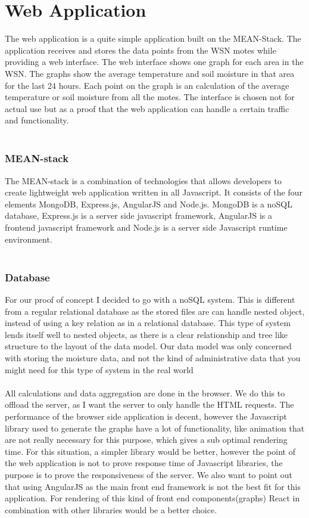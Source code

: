 \documentclass[]{uiophd}
\begin{document}
\section{Web Application}
The web application is a quite simple application built on the MEAN-Stack. The application receives and stores the data points from the WSN motes while providing a web interface. The web interface shows one graph for each area in the WSN. The graphs show the average temperature and soil moisture in that area for the last 24 hours. Each point on the graph is an calculation of the average temperature or soil moisture from all the motes. The interface is chosen not for actual use but as a proof that the web application can handle a certain traffic and functionality. 
\\\\
\subsubsection{MEAN-stack}
The MEAN-stack is a combination of technologies that allows developers to create lightweight web application written in all Javascript. It consists of the four elements MongoDB, Express.js, AngularJS and Node.js. MongoDB is a noSQL database, Express.js is a server side javascript framework, AngularJS is a frontend javascript framework and Node.js is a server side Javascript runtime environment. 
\\\\
\subsubsection{Database}
For our proof of concept I decided to go with a noSQL system. This is different from a regular relational database as the stored files are can handle nested object, instead of using a key relation as in a relational database. This type of system lends itself well to nested objects, as there is a clear relationship and tree like structure to the layout of the data model. Our data model was only concerned with storing the moisture data, and not the kind of administrative data that you might need for this type of system in the real world
\\\\
All calculations and data aggregation are done in the browser. We do this to offload the server, as I want the server to only handle the HTML requests. The performance of the browser side application is decent, however the Javascript library used to generate the graphs have a lot of functionality, like animation that are not really necessary for this purpose, which gives a sub optimal rendering time. For this situation, a simpler library would be better, however the point of the web application is not to prove response time of Javascript libraries, the purpose is to prove the responsiveness of the server. We also want to point out that using AngularJS as the main front end framework is not the best fit for this application. For rendering of this kind of front end components(graphs) React in combination with other libraries would be a better choice. 
\end{document}
